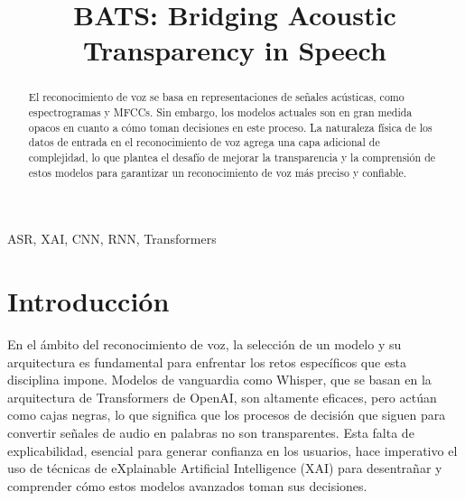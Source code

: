 \documentclass[conference]{IEEEtran}
\begin{document}
\title{BATS: Bridging Acoustic Transparency in Speech}

\author{
\and
{}
}

\maketitle

\begin{abstract}

El reconocimiento de voz se basa en representaciones de señales acústicas, como espectrogramas y MFCCs. Sin embargo, los modelos actuales son en gran medida opacos en cuanto a cómo toman decisiones en este proceso. La naturaleza física de los datos de entrada en el reconocimiento de voz agrega una capa adicional de complejidad, lo que plantea el desafío de mejorar la transparencia y la comprensión de estos modelos para garantizar un reconocimiento de voz más preciso y confiable.

\end{abstract}

\begin{IEEEkeywords}
ASR, XAI, CNN, RNN, Transformers
\end{IEEEkeywords}

\section{Introducción}

En el ámbito del reconocimiento de voz, la selección de un modelo y su arquitectura es fundamental para enfrentar los retos específicos que esta disciplina impone. Modelos de vanguardia como Whisper, que se basan en la arquitectura de Transformers de OpenAI, son altamente eficaces, pero actúan como cajas negras, lo que significa que los procesos de decisión que siguen para convertir señales de audio en palabras no son transparentes. Esta falta de explicabilidad, esencial para generar confianza en los usuarios, hace imperativo el uso de técnicas de eXplainable Artificial Intelligence (XAI) para desentrañar y comprender cómo estos modelos avanzados toman sus decisiones.
\end{document}
